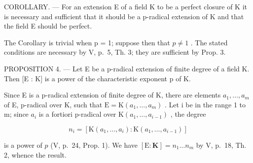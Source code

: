 COROLLARY. --- For an extension E of a field K to be a perfect closure of K it is necessary and sufficient that it should be a p-radical extension of K and that the field E should be perfect.

The Corollary is trivial when p = 1; suppose then that \(p \neq 1\) . The stated conditions are necessary by V, p.~5, Th. 3; they are sufficient by Prop. 3.

PROPOSITION 4. --- Let E be a p-radical extension of finite degree of a field K. Then {[}E : K{]} is a power of the characteristic exponent p of K.

Since E is a p-radical extension of finite degree of K, there are elements \(a_{1}, \ldots, a_{m}\) of E, p-radical over K, such that \(\mathrm{E} = \mathrm{K}(a_{1}, \ldots, a_{m})\) . Let i be in the range 1 to m; since \(a_{i}\) is a fortiori p-radical over \(\mathrm{K}(a_{1}, \ldots, a_{i-1})\) , the degree

\[
n _ {i} = \left[ \mathrm{K} (a _ {1}, \dots , a _ {i}): \mathrm{K} (a _ {1}, \dots , a _ {i - 1}) \right]
\]

is a power of \(p\) (V, p.~24, Prop. 1). We have \([\mathrm{E}:\mathbf{K}] = n_1\ldots n_m\) by V, p.~18, Th. 2, whence the result.

